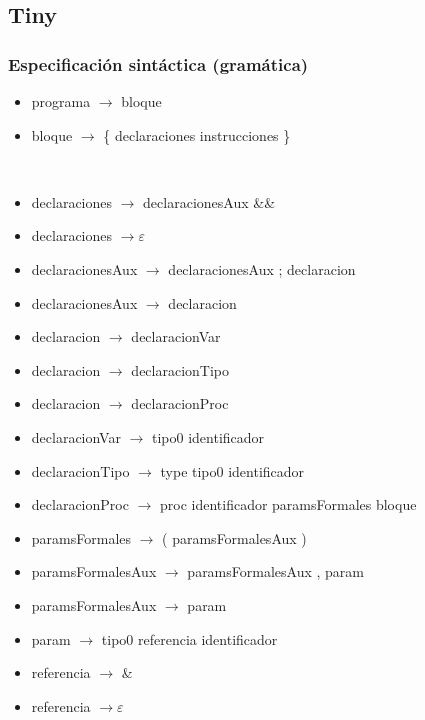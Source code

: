 \documentclass[11pt]{article}
\begin{document}
        \subsection{Tiny}
        \subsubsection{Especificación sintáctica (gramática)}
        \begin{itemize}
            \item programa $\rightarrow$ bloque
            \item bloque $\rightarrow$ \{ declaraciones instrucciones \}
        \end{itemize}
        \
        \begin{itemize}
            \item declaraciones $\rightarrow$ declaracionesAux \&\&
            \item declaraciones $\rightarrow \varepsilon$
            \item declaracionesAux $\rightarrow$ declaracionesAux ; declaracion
            \item declaracionesAux $\rightarrow$ declaracion
            \item declaracion $\rightarrow$ declaracionVar
            \item declaracion $\rightarrow$ declaracionTipo
            \item declaracion $\rightarrow$ declaracionProc
            \item declaracionVar $\rightarrow$ tipo0 identificador
            \item declaracionTipo $\rightarrow$ type tipo0 identificador
            \item declaracionProc $\rightarrow$ proc identificador paramsFormales bloque
            \item paramsFormales $\rightarrow$ ( paramsFormalesAux )
            \item paramsFormalesAux $\rightarrow$ paramsFormalesAux , param
            \item paramsFormalesAux $\rightarrow$ param
            \item param $\rightarrow$ tipo0 referencia identificador
            \item referencia $\rightarrow$ \&
            \item referencia $\rightarrow \varepsilon$
        \end{itemize}
        \
\end{document}
